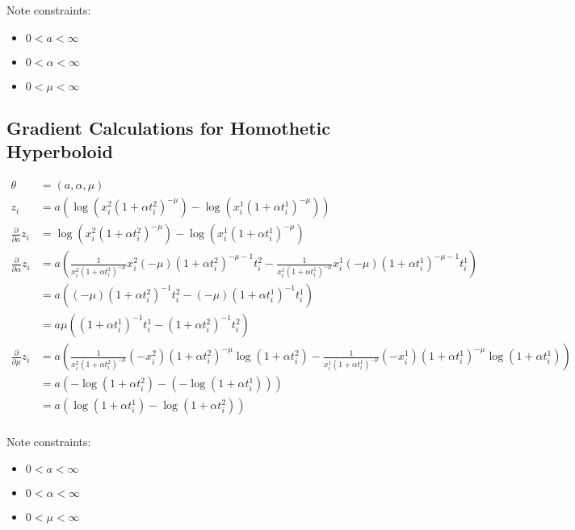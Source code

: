 \documentclass[12pt]{article}
\begin{document}
Note constraints:

\begin{itemize}
    \item{$0 < a < \infty$}
    \item{$0 < \alpha < \infty$}
    \item{$0 < \mu < \infty$}
\end{itemize}

\subsection{Gradient Calculations for Homothetic Hyperboloid}

\begin{align*}
\theta &= (a, \alpha, \mu) \\
z_i &= a (
  \log(x^2_i (1 + \alpha t^2_i)^{-\mu})
  - \log(x^1_i (1 + \alpha t^1_i)^{-\mu})
) \\
\frac{\partial}{\partial a} z_i
  &= \log(x^2_i (1 + \alpha t^2_i)^{-\mu})
  - \log(x^1_i (1 + \alpha t^1_i)^{-\mu}) \\
\frac{\partial}{\partial \alpha} z_i
  &= a (
    \frac{1}{x^2_i (1 + \alpha t^2_i)^{-\mu}} x^2_i (-\mu) (1 + \alpha t^2_i)^{-\mu - 1} t^2_i
    - \frac{1}{x^1_i (1 + \alpha t^1_i)^{-\mu}} x^1_i (-\mu) (1 + \alpha t^1_i)^{-\mu - 1} t^1_i
  ) \\
  &= a (
    (-\mu) (1 + \alpha t^2_i)^{-1} t^2_i
    - (-\mu) (1 + \alpha t^1_i)^{-1} t^1_i
  ) \\
  &= a \mu ((1 + \alpha t^1_i)^{-1} t^1_i - (1 + \alpha t^2_i)^{-1} t^2_i) \\
\frac{\partial}{\partial \mu} z_i
  &= a (
    \frac{1}{x^2_i (1 + \alpha t^2_i)^{-\mu}} (-x^2_i) (1 + \alpha t^2_i)^{-\mu} \log(1 + \alpha t^2_i)
    - \frac{1}{x^1_i (1 + \alpha t^1_i)^{-\mu}} (-x^1_i) (1 + \alpha t^1_i)^{-\mu} \log(1 + \alpha t^1_i)
  ) \\
  &= a (
    -\log(1 + \alpha t^2_i) - (-\log(1 + \alpha t^1_i))
  ) \\
  &= a (\log(1 + \alpha t^1_i) - \log(1 + \alpha t^2_i)) \\
\end{align*}

Note constraints:

\begin{itemize}
    \item{$0 < a < \infty$}
    \item{$0 < \alpha < \infty$}
    \item{$0 < \mu < \infty$}
\end{itemize}
\end{document}
